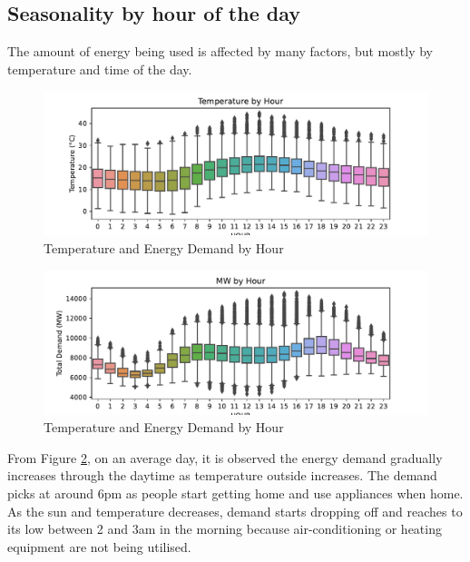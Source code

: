 \documentclass[mstat,12pt]{unswthesis}
\begin{document}
\hypertarget{seasonality-by-hour-of-the-day}{%
\subsection{Seasonality by hour of the
day}\label{seasonality-by-hour-of-the-day}}

The amount of energy being used is affected by many factors, but mostly
by temperature and time of the day.

\begin{figure}[H]
\includegraphics[width=1\linewidth,]{ZZSC9020_Group_Report_files/figure-latex/plot-demand-temperature-by-hour-1} \caption{Temperature and Energy Demand by Hour}\label{fig:plot-demand-temperature-by-hour}
\end{figure}
\begin{figure}[H]
\includegraphics[width=1\linewidth,]{ZZSC9020_Group_Report_files/figure-latex/plot-demand-temperature-by-hour-2} \caption{Temperature and Energy Demand by Hour}\label{fig:plot-demand-temperature-by-hour}
\end{figure}

From Figure \ref{fig:plot-demand-temperature-by-hour}, on an average
day, it is observed the energy demand gradually increases through the
daytime as temperature outside increases. The demand picks at around 6pm
as people start getting home and use appliances when home. As the sun
and temperature decreases, demand starts dropping off and reaches to its
low between 2 and 3am in the morning because air-conditioning or heating
equipment are not being utilised.
\end{document}
